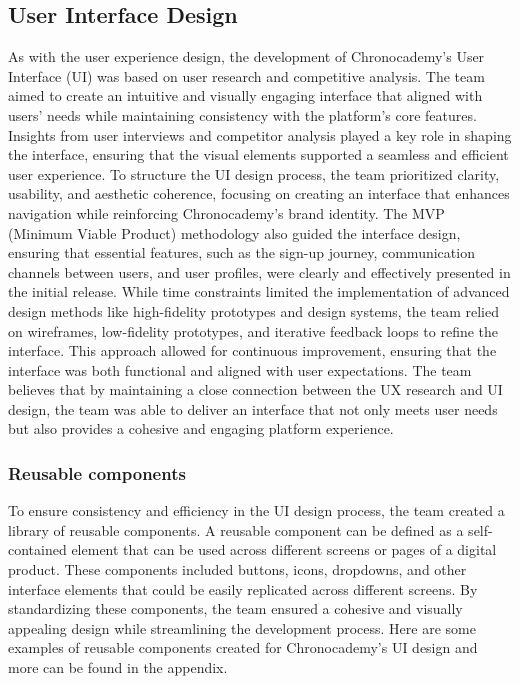\subsection{User Interface Design}\label{subsec:user-interface-design}
As with the user experience design, the development of Chronocademy’s User Interface (UI) was based on user research and competitive analysis.
The team aimed to create an intuitive and visually engaging interface that aligned with users’ needs while maintaining consistency with the platform’s core features.
Insights from user interviews and competitor analysis played a key role in shaping the interface, ensuring that the visual elements supported a seamless and efficient user experience.\newline
To structure the UI design process, the team prioritized clarity, usability, and aesthetic coherence, focusing on creating an interface that enhances navigation while reinforcing Chronocademy’s brand identity.
The MVP (Minimum Viable Product) methodology also guided the interface design, ensuring that essential features, such as the sign-up journey, communication channels between users, and user profiles, were clearly and effectively presented in the initial release.\newline
While time constraints limited the implementation of advanced design methods like high-fidelity prototypes and design systems, the team relied on wireframes, low-fidelity prototypes, and iterative feedback loops to refine the interface.
This approach allowed for continuous improvement, ensuring that the interface was both functional and aligned with user expectations.
The team believes that by maintaining a close connection between the UX research and UI design, the team was able to deliver an interface that not only meets user needs but also provides a cohesive and engaging platform experience.

\subsubsection{Reusable components}\label{subsubsec:rereusable-components}
To ensure consistency and efficiency in the UI design process, the team created a library of reusable components.
A reusable component can be defined as a self-contained element that can be used across different screens or pages of a digital product.
These components included buttons, icons, dropdowns, and other interface elements that could be easily replicated across different screens.
By standardizing these components, the team ensured a cohesive and visually appealing design while streamlining the development process.
Here are some examples of reusable components created for Chronocademy's UI design and more can be found in the appendix.

